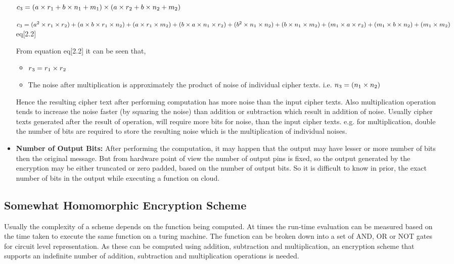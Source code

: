 \begin{itemize}
$c\textsubscript{3}=(a\times r\textsubscript{1}+b\times n\textsubscript{1} +m\textsubscript{1})\times (a\times r\textsubscript{2}+b\times n\textsubscript{2}  +m\textsubscript{2})$

$c\textsubscript{3}=(a^{2}\times r\textsubscript{1}\times r\textsubscript{2})+(a\times b\times r\textsubscript{1}\times n\textsubscript{2})+(a\times r\textsubscript{1}\times m\textsubscript{2})+(b\times a\times n\textsubscript{1}\times r\textsubscript{2})+(b^{2}\times n\textsubscript{1}\times n\textsubscript{2})
+(b\times n\textsubscript{1}\times m\textsubscript{2})+(m\textsubscript{1}\times a\times r\textsubscript{2})+(m\textsubscript{1}\times b\times n\textsubscript{2})+(m\textsubscript{1}\times m\textsubscript{2})$         \hfill                                        eq[2.2]

From equation eq[2.2] it can be seen that,
\begin{itemize}
\item
 \noindent $r\textsubscript{3}=r\textsubscript{1}\times r\textsubscript{2}$
\item
The noise after multiplication is approximately the product of noise of individual cipher texts. i.e.
$n\textsubscript{3}=(n\textsubscript{1}\times n\textsubscript{2})$
\end{itemize}
Hence the resulting cipher text after performing computation has more noise than the input cipher texts. Also multiplication operation  tends  to  increase  the noise faster (by squaring the noise) than addition or subtraction which result in addition of noise. Usually cipher texts generated after the result of operation, will require more bits for noise, than the input cipher texts. e.g. for multiplication, double the number of bits are required to store the resulting noise which is the multiplication of individual noises.
\item
\textbf{Number of Output Bits:} After performing the computation, it may happen that the output may have lesser or more number of bits then the original message. But from hardware point of view the number of output pins is fixed, so the output generated by the encryption may be either truncated or zero padded, based on the number of output bits. So it is difficult to know in prior, the exact number of bits in the output while executing a function on cloud.

\end{itemize}

 \subsection{Somewhat Homomorphic Encryption Scheme}
     Usually the complexity of a scheme depends on the function being computed. At times the run-time evaluation can be measured based on the time taken to execute the same function on a turing machine. The function can be broken down into a set of AND, OR or NOT gates for circuit level representation. As these can be computed using addition, subtraction and multiplication, an encryption scheme that supports an indefinite number of addition, subtraction and multiplication operations is needed.
   
